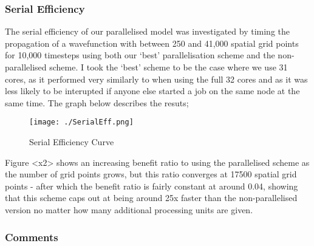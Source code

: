 \subsubsection{Serial Efficiency}
The serial efficiency of our parallelised model was investigated by timing the propagation of a wavefunction with between 250 and 41,000 spatial grid points for 10,000 timesteps using both our `best' parallelisation scheme and the non-parallelised scheme. I took the `best' scheme to be the case where we use 31 cores, as it performed very similarly to when using the full 32 cores and as it was less likely to be interupted if anyone else started a job on the same node at the same time. The graph below describes the resuts;

\begin{figure}[H]
         \texttt{[image: ./SerialEff.png]}
         \centering
         \caption{Serial Efficiency Curve}
\end{figure}



Figure <x2> shows an increasing benefit ratio to using the parallelised scheme as the number of grid points grows, but this ratio converges at 17500 spatial grid points - after which the benefit ratio is fairly constant at around 0.04, showing that this scheme caps out at being around 25x faster than the non-parallelised version no matter how many additional processing units are given.

\subsubsection{Comments}

